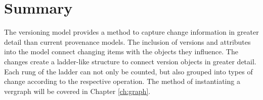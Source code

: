 \section{Summary}

The versioning model provides a method to capture \gls{change} information in greater detail than current provenance models.
The inclusion of \glspl{version} and \glspl{attribute} into the model connect changing items with the objects they influence.
The \glspl{change} create a ladder-like structure to connect \gls{version} objects in greater detail.
Each rung of the ladder can not only be counted, but also grouped into types of change according to the respective operation.
The method of instantiating a \gls{vergraph} will be covered in Chapter \ref{ch:graph}.


